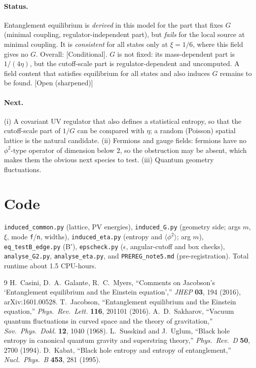 \documentclass[11pt]{article}
\newcommand{\st}[1]{\textsf{\small[#1]}}
\begin{document}
\paragraph{Status.} Entanglement equilibrium is \emph{derived} in this model for the part that fixes $G$ (minimal coupling, regulator-independent part), but \emph{fails} for the local source at minimal coupling. It is \emph{consistent} for all states only at $\xi=1/6$, where this field gives no $G$. Overall: \st{Conditional}. $G$ is not fixed: its mass-dependent part is $1/(4\eta)$, but the cutoff-scale part is regulator-dependent and uncomputed. A field content that satisfies equilibrium for all states and also induces $G$ remains to be found. \st{Open (sharpened)}

\paragraph{Next.} (i) A covariant UV regulator that also defines a statistical entropy, so that the cutoff-scale part of $1/G$ can be compared with $\eta$; a random (Poisson) spatial lattice is the natural candidate. (ii) Fermions and gauge fields: fermions have no $\phi^2$-type operator of dimension below $2$, so the obstruction may be absent, which makes them the obvious next species to test. (iii) Quantum geometry fluctuations.

\section*{Code}
\texttt{induced\_common.py} (lattice, PV energies), \texttt{induced\_G.py} (geometry side; args $m$, $\xi$, mode \texttt{f}/\texttt{n}, widths), \texttt{induced\_eta.py} (entropy and $\langle\phi^2\rangle$; arg $m$), \texttt{eq\_testB\_edge.py} (B$'$), \texttt{epscheck.py} ($\epsilon$, angular-cutoff and box checks), \texttt{analyse\_G2.py}, \texttt{analyse\_eta.py}, and \texttt{PREREG\_note5.md} (pre-registration). Total runtime about 1.5 CPU-hours.

\begin{thebibliography}{9}
 H.~Casini, D.~A.~Galante, R.~C.~Myers, ``Comments on Jacobson's `Entanglement equilibrium and the Einstein equation','' \emph{JHEP} \textbf{03}, 194 (2016), arXiv:1601.00528.
 T.~Jacobson, ``Entanglement equilibrium and the Einstein equation,'' \emph{Phys.\ Rev.\ Lett.} \textbf{116}, 201101 (2016).
 A.~D.~Sakharov, ``Vacuum quantum fluctuations in curved space and the theory of gravitation,'' \emph{Sov.\ Phys.\ Dokl.} \textbf{12}, 1040 (1968).
 L.~Susskind and J.~Uglum, ``Black hole entropy in canonical quantum gravity and superstring theory,'' \emph{Phys.\ Rev.\ D} \textbf{50}, 2700 (1994).
 D.~Kabat, ``Black hole entropy and entropy of entanglement,'' \emph{Nucl.\ Phys.\ B} \textbf{453}, 281 (1995).
\end{thebibliography}
\end{document}
